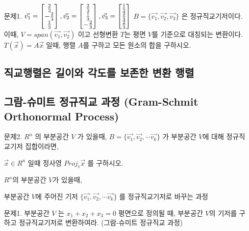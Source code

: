 \newpage
문제1. $\vec{v_1} = \begin{bmatrix} {2 \over 3} \\ -{2 \over 3} \\ {1 \over 3} \end{bmatrix}, \vec{v_2} = \begin{bmatrix} {2 \over 3} \\ {1 \over 3} \\ -{2 \over 3} \end{bmatrix}, \vec{v_3} = \begin{bmatrix} {1 \over 3} \\ {2 \over 3} \\ {2 \over 3} \end{bmatrix}$ $B=\{ \vec{v_1}, \vec{v_2}, \vec{v_3} \}$ 은 정규직교기저이다. 이때, $V=span(\vec{v_1}, \vec{v_2})$ 이고 선형변환 $T$는 평면 $V$를 기준으로 대칭되는 변환이다. $T(\vec{x}) = A\vec{x}$ 일때, 행렬 $A$를 구하고 모든 원소의 합을 구하시오.
\newpage
\subsection{직교행렬은 길이와 각도를 보존한 변환 행렬}
\begin{theorem}

\end{theorem}

\newpage
\subsection{그람-슈미트 정규직교 과정 (Gram-Schmit Orthonormal Process)}
\newpage
문제2. $R^n$ 의 부분공간 $V$ 가 있을때, $B = \{ \vec{v_1},\vec{v_2}, \cdots \vec{v_k} \}$ 가 부분공간 $V$에 대해 정규직교기저 집합이라면,

$\vec{x} \in R^n$ 일때 정사영 $Proj_v\vec{x}$ 를 구하시오.

\begin{definition} 
$R^n$의 부분공간 $V$가 있을때, 

부분공간 $V$에 주어진 기저 $\{ \vec{v_1}, \vec{v_2}, \cdots \vec{v_k} \}$ 를 정규직교기저로 바꾸는 과정
\end{definition}





\newpage
문제1. 부분공간 $V$ 는 $x_1 + x_2 + x_3 = 0$ 평면으로 정의될 때, 부분공간 $V$의 기저를 구하고 정규직교기저로 변환하여라. (그람-슈미트 정규직교 과정)


